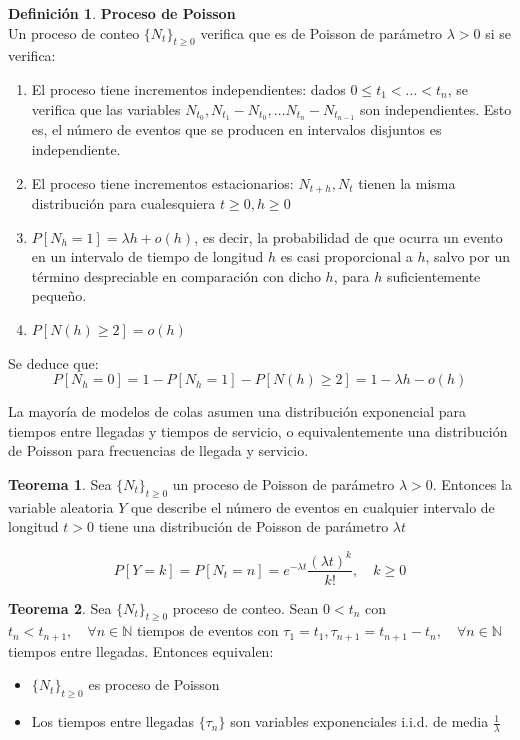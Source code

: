 \documentclass[a4paper,10pt]{scrartcl}
\theoremstyle{definition}
\newtheorem*{mydef}{Definición}
\newtheorem*{theorem}{Teorema}
\numberwithin{equation}{section}
\begin{document}
  \begin{mydef} \textbf{Proceso de Poisson}\\
  Un proceso de conteo $\{N_t\}_{t\ge 0}$ verifica que es de Poisson de parámetro $\lambda > 0$ si se verifica:
  
  \begin{enumerate}
    \item El proceso tiene incrementos independientes: dados $0 \le t_1 < \ldots < t_n$, se verifica que
    las variables $N_{t_0}, N_{t_1} - N_{t_0}, \ldots N_{t_n}- N_{t_{n-1}}$ son independientes. Esto es, el número de eventos
    que se producen en intervalos disjuntos es independiente.
    \item El proceso tiene incrementos estacionarios: $N_{t+h}, N_t$ tienen la misma distribución para cualesquiera
    $t\ge 0, h\ge 0$
    \item $P[N_h = 1] = \lambda h + o(h)$, es decir, la probabilidad de que ocurra un evento en un intervalo de
    tiempo de longitud $h$ es casi proporcional a $h$, salvo por un término despreciable en comparación con dicho $h$, para
    $h$ suficientemente pequeño.
    \item $P[N(h) \ge 2] = o(h)$
  \end{enumerate}

  Se deduce que: 
  \[P[N_h = 0] = 1 - P[N_h=1] - P[N(h) \ge 2] = 1 -\lambda h - o(h)\]
  \end{mydef}


La mayoría de modelos de colas asumen una distribución exponencial para tiempos entre llegadas y tiempos 
de servicio, o equivalentemente una distribución de Poisson para frecuencias de llegada y servicio.

\begin{theorem}
 Sea $\{N_t\}_{t\ge 0}$ un proceso de Poisson de parámetro $\lambda > 0$. Entonces la variable aleatoria $Y$ que
 describe el número de eventos en cualquier intervalo de longitud $t > 0$ tiene una distribución de Poisson de parámetro
 $\lambda t$
 
 \[P[Y = k] = P[N_t = n] = e^{-\lambda t} \frac{(\lambda t)^k}{k!}, \quad k\ge 0\]
 
\end{theorem}


\begin{theorem}
 Sea $\{N_t\}_{t\ge 0}$ proceso de conteo. Sean $0 < t_n$ con $t_{n} < t_{n+1}, \quad \forall n\in 
 \mathbb{N}$ tiempos de eventos con $\tau_1= t_1, \tau_{n+1} = t_{n+1} - t_{n}, \quad \forall n\in
 \mathbb{N}$ tiempos entre llegadas. Entonces equivalen:
 
 \begin{itemize}
  \item $\{N_t\}_{t\ge 0}$ es proceso de Poisson
  \item Los tiempos entre llegadas $\{\tau_n\}$ son variables exponenciales i.i.d. de media $\frac{1}{\lambda}$
 \end{itemize}

\end{theorem}
\end{document}
